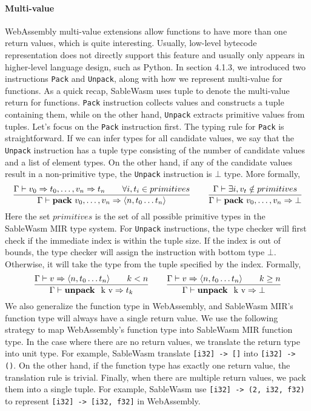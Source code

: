 \paragraph{Multi-value} WebAssembly multi-value extensions allow functions to have more than one return values, which is quite interesting. Usually, low-level bytecode representation does not directly support this feature and usually only appears in higher-level language design, such as Python. In section 4.1.3, we introduced two instructions \texttt{Pack} and \texttt{Unpack}, along with how we represent multi-value for functions. As a quick recap, SableWasm uses tuple to denote the multi-value return for functions. \texttt{Pack} instruction collects values and constructs a tuple containing them, while on the other hand, \texttt{Unpack} extracts primitive values from tuples. Let's focus on the \texttt{Pack} instruction first. The typing rule for \texttt{Pack} is straightforward. If we can infer types for all candidate values, we say that the \texttt{Unpack} instruction has a tuple type consisting of the number of candidate values and a list of element types. On the other hand, if any of the candidate values result in a non-primitive type, the \texttt{Unpack} instruction is $\bot$ type. More formally,
$$
    \frac{\Gamma \vdash v_0 \Rightarrow t_0, \dots, v_n \Rightarrow t_n \qquad \forall i, t_i \in primitives}{\Gamma \vdash \text{\textbf{pack} } v_0, \dots, v_n \Rightarrow \langle n, t_0 \dots t_n \rangle}
    \qquad
    \frac{\Gamma \vdash \exists i, v_t \notin primitives}{\Gamma \vdash \text{\textbf{pack} } v_0, \dots, v_n \Rightarrow \bot}
$$
Here the set $primitives$ is the set of all possible primitive types in the SableWasm MIR type system. For \texttt{Unpack} instructions, the type checker will first check if the immediate index is within the tuple size. If the index is out of bounds, the type checker will assign the instruction with bottom type $\bot$. Otherwise, it will take the type from the tuple specified by the index. Formally,
$$
    \frac{\Gamma \vdash v \Rightarrow \langle n, t_0 \dots t_n \rangle \qquad k < n}{\Gamma \vdash \text{\textbf{unpack } k v} \Rightarrow t_k}
    \qquad
    \frac{\Gamma \vdash v \Rightarrow \langle n, t_0 \dots t_n \rangle \qquad k \geq n}{\Gamma \vdash \text{\textbf{unpack } k v} \Rightarrow \bot}
$$
We also generalize the function type in WebAssembly, and SableWasm MIR's function type will always have a single return value. We use the following strategy to map WebAssembly's function type into SableWasm MIR function type. In the case where there are no return values, we translate the return type into unit type. For example, SableWasm translate \texttt{[i32] -> []} into \texttt{[i32] -> ()}. On the other hand, if the function type has exactly one return value, the translation rule is trivial. Finally, when there are multiple return values, we pack them into a single tuple. For example, SableWasm use \texttt{[i32] -> (2, i32, f32)} to represent \texttt{[i32] -> [i32, f32]}  in WebAssembly.

